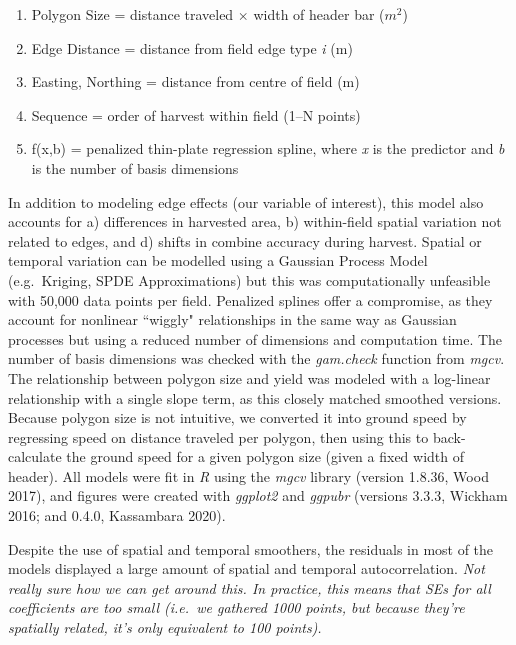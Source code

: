 \documentclass[]{elsarticle} %
\providecommand{\tightlist}{%
  \setlength{\itemsep}{0pt}\setlength{\parskip}{0pt}}
\begin{document}
\begin{enumerate}
\def\labelenumi{\arabic{enumi}.}
\tightlist
\item
  Polygon Size = distance traveled \(\times\) width of header bar (\(m^2\))
\item
  Edge Distance = distance from field edge type \emph{i} (m)
\item
  Easting, Northing = distance from centre of field (m)
\item
  Sequence = order of harvest within field (1--N points)
\item
  f(x,b) = penalized thin-plate regression spline, where \emph{x} is the predictor and \emph{b} is the number of basis dimensions
\end{enumerate}

In addition to modeling edge effects (our variable of interest), this model also accounts for a) differences in harvested area, b) within-field spatial variation not related to edges, and d) shifts in combine accuracy during harvest.
Spatial or temporal variation can be modelled using a Gaussian Process Model (e.g.~Kriging, SPDE Approximations) but this was computationally unfeasible with 50,000 data points per field.
Penalized splines offer a compromise, as they account for nonlinear ``wiggly" relationships in the same way as Gaussian processes but using a reduced number of dimensions and computation time.
The number of basis dimensions was checked with the \emph{gam.check} function from \emph{mgcv}.
The relationship between polygon size and yield was modeled with a log-linear relationship with a single slope term, as this closely matched smoothed versions.
Because polygon size is not intuitive, we converted it into ground speed by regressing speed on distance traveled per polygon, then using this to back-calculate the ground speed for a given polygon size (given a fixed width of header).
All models were fit in \emph{R} using the \emph{mgcv} library (version 1.8.36, Wood 2017), and figures were created with \emph{ggplot2} and \emph{ggpubr} (versions 3.3.3, Wickham 2016; and 0.4.0, Kassambara 2020).

Despite the use of spatial and temporal smoothers, the residuals in most of the models displayed a large amount of spatial and temporal autocorrelation.
\emph{Not really sure how we can get around this. In practice, this means that SEs for all coefficients are too small (i.e.~we gathered 1000 points, but because they're spatially related, it's only equivalent to 100 points).}
\end{document}
